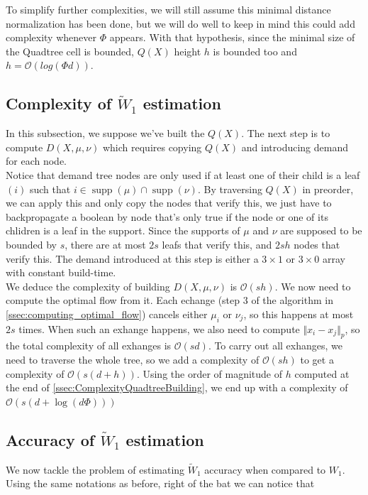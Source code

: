 \documentclass[11pt]{article}
\DeclareMathOperator\supp{supp}
\begin{document}
To simplify further complexities, we will still assume this minimal distance normalization has been done, but we will do well to keep in mind this could add complexity whenever $\Phi$ appears. With that hypothesis, since the minimal size of the Quadtree cell is bounded, $Q(X)$ height $h$ is bounded too and $h = \mathcal{O}(log(\Phi d))$.

\subsection{Complexity of $\widetilde{W}_1$ estimation}
In this subsection, we suppose we've built the $Q(X)$. The next step is to compute $D(X, \mu, \nu)$ which requires copying $Q(X)$ and introducing demand for each node.\\
Notice that demand tree nodes are only used if at least one of their child is a leaf $(i)$ such that $i \in \supp(\mu) \cap \supp(\nu)$. By traversing $Q(X)$ in preorder, we can apply this and only copy the nodes that verify this, we just have to backpropagate a boolean by node that's only true if the node or one of its chlidren is a leaf in the support. Since the supports of $\mu$ and $\nu$ are supposed to be bounded by $s$, there are at most $2s$ leafs that verify this, and $2sh$ nodes that verify this. The demand introduced at this step is either a $3 \times 1$ or $3 \times 0$ array with constant build-time.\\
We deduce the complexity of building $D(X, \mu, \nu)$ is $\mathcal{O}(sh)$. We now need to compute the optimal flow from it. Each echange (step 3 of the algorithm in \ref{ssec:computing_optimal_flow}) cancels either $\mu_i$ or $\nu_j$, so this happens at most $2s$ times. When such an exhange happens, we also need to compute $\Vert x_i - x_j \Vert_p$, so the total complexity of all exhanges is $\mathcal{O}(sd)$. To carry out all exhanges, we need to traverse the whole tree, so we add a complexity of $\mathcal{O}(sh)$ to get a complexity of $\mathcal{O}(s(d+h))$. Using the order of magnitude of $h$ computed at the end of \ref{ssec:ComplexityQuadtreeBuilding}, we end up with a complexity of $\mathcal{O} \left(s \left(d+\log(d\Phi)\right) \right)$

\subsection{Accuracy of $\widetilde{W}_1$ estimation}
We now tackle the problem of estimating $\widetilde{W}_1$ accuracy when compared to $W_1$. Using the same notations as before, right of the bat we can notice that
\end{document}
